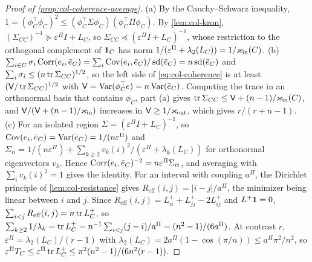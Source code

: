 \begin{proof}[Proof of \cref{prop:col-coherence-average}]
(a) By the Cauchy--Schwarz inequality, $1=(\phi_C^\top\phi_C)^2\le(\phi_C^\top\Sigma\phi_C)\allowbreak(\phi_C^\top\Pi\phi_C)$. By \cref{lem:col-kron}, $(\Sigma_{CC})^{-1}\succeq\varepsilon^\Pi I+L_C$, so $\Sigma_{CC}\preceq(\varepsilon^\Pi I+L_C)^{-1}$, whose restriction to the orthogonal complement of $\mathbf{1}_C$ has norm $1/(\varepsilon^\Pi+\lambda_2(L_C))=1/\varkappa_{\mathrm{in}}(C)$. (b) $\sum_{i\in C}\sigma_i\operatorname{Corr}(e_i,\bar e_C)=\sum_i\operatorname{Cov}(e_i,\bar e_C)/\operatorname{sd}(\bar e_C)=n\operatorname{sd}(\bar e_C)$ and $\sum_i\sigma_i\le(n\operatorname{tr}\Sigma_{CC})^{1/2}$, so the left side of \eqref{eq:col-coherence} is at least $(\mathsf V/\operatorname{tr}\Sigma_{CC})^{1/2}$ with $\mathsf V=\operatorname{Var}(\phi_C^\top e)=n\operatorname{Var}(\bar e_C)$. Computing the trace in an orthonormal basis that contains $\phi_C$, part (a) gives $\operatorname{tr}\Sigma_{CC}\le\mathsf V+(n-1)/\varkappa_{\mathrm{in}}(C)$, and $\mathsf V/(\mathsf V+(n-1)/\varkappa_{\mathrm{in}})$ increases in $\mathsf V\ge1/\varkappa_{\mathrm{out}}$, which gives $r/(r+n-1)$. (c) For an isolated region $\Sigma=(\varepsilon^\Pi I+L_C)^{-1}$, so $\operatorname{Cov}(e_i,\bar e_C)=\operatorname{Var}(\bar e_C)=1/(n\varepsilon^\Pi)$ and $\Sigma_{ii}=1/(n\varepsilon^\Pi)+\sum_{k\ge2}v_k(i)^2/(\varepsilon^\Pi+\lambda_k(L_C))$ for orthonormal eigenvectors $v_k$. Hence $\operatorname{Corr}(e_i,\bar e_C)^{-2}=n\varepsilon^\Pi\Sigma_{ii}$, and averaging with $\sum_iv_k(i)^2=1$ gives the identity. For an interval with coupling $a^\Pi$, the Dirichlet principle of \cref{lem:col-resistance} gives $R_{\mathrm{eff}}(i,j)=|i-j|/a^\Pi$, the minimizer being linear between $i$ and $j$. Since $R_{\mathrm{eff}}(i,j)=L^+_{ii}+L^+_{jj}-2L^+_{ij}$ and $L^+\mathbf{1}=0$, $\sum_{i<j}R_{\mathrm{eff}}(i,j)=n\operatorname{tr} L_C^+$, so $\sum_{k\ge2}1/\lambda_k=\operatorname{tr} L_C^+=n^{-1}\sum_{i<j}(j-i)/a^\Pi=(n^2-1)/(6a^\Pi)$. At contrast $r$, $\varepsilon^\Pi=\lambda_2(L_C)/(r-1)$ with $\lambda_2(L_C)=2a^\Pi(1-\cos(\pi/n))\le a^\Pi\pi^2/n^2$, so $\varepsilon^\Pi T_C\le\varepsilon^\Pi\operatorname{tr} L_C^+\le\pi^2(n^2-1)/(6n^2(r-1))$.
\end{proof}

